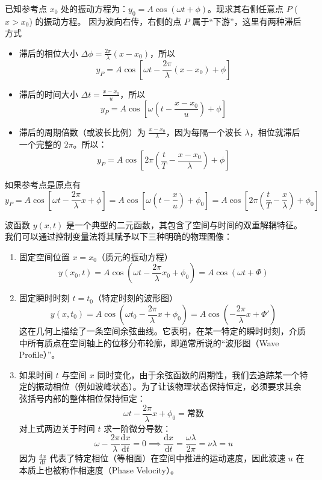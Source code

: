 \documentclass[lang=cn,11pt]{elegantbook}
\begin{document}
\begin{theorem}[平面简谐波函数推导]
已知参考点 $x_0$ 处的振动方程为：$y_0 = A \cos(\omega t + \phi)$。现求其右侧任意点 $P$ ($x > x_0$) 的振动方程。
因为波向右传，右侧的点 $P$ 属于“下游”，这里有两种滞后方式
\begin{itemize}
\item 滞后的相位大小 $\Delta \phi = \frac{2\pi}{\lambda}(x - x_0)$，所以\[y_P = A \cos \left[ \omega t - \frac{2\pi}{\lambda}(x - x_0) + \phi \right]\]
\item 滞后的时间大小 $\Delta t = \frac{x - x_0}{u}$，所以\[y_P = A \cos \left[ \omega \left( t - \frac{x - x_0}{u} \right) + \phi \right]\]
\item 滞后的周期倍数（或波长比例）为 $\frac{x - x_0}{\lambda}$，因为每隔一个波长 $\lambda$，相位就滞后一个完整的 $2\pi$。所以：$$\boxed{y_P = A \cos \left[ 2\pi \left( \frac{t}{T} - \frac{x-x_0}{\lambda} \right) + \phi \right]}$$
\end{itemize}
如果参考点是原点有$$y_P = A \cos \left[ \omega t - \frac{2\pi}{\lambda}x + \phi \right]= A \cos \left[ \omega \left( t - \frac{x}{u} \right) + \phi_0 \right]=A \cos \left[ 2\pi \left( \frac{t}{T} - \frac{x}{\lambda} \right) + \phi_0 \right]$$
\end{theorem}
波函数 $y(x,t)$ 是一个典型的二元函数，其包含了空间与时间的双重解耦特征。我们可以通过控制变量法将其赋予以下三种明确的物理图像：
\begin{enumerate}
    \item 固定空间位置 $x = x_0$（质元的振动方程）$$y(x_0, t) = A \cos \left( \omega t - \frac{2\pi}{\lambda}x_0 + \phi_0 \right) = A \cos (\omega t + \Phi)$$
    \item 固定瞬时时刻 $t = t_0$（特定时刻的波形图）$$y(x, t_0) = A \cos \left( \omega t_0 - \frac{2\pi}{\lambda}x + \phi_0 \right) = A \cos \left( -\frac{2\pi}{\lambda}x + \Phi' \right)$$这在几何上描绘了一条空间余弦曲线。它表明，在某一特定的瞬时时刻，介质中所有质点在空间轴上的位移分布轮廓，即通常所说的“波形图（Wave Profile）”。
    \item 如果时间 $t$ 与空间 $x$ 同时变化，由于余弦函数的周期性，我们去追踪某一个特定的振动相位（例如波峰状态）。为了让该物理状态保持恒定，必须要求其余弦括号内部的整体相位保持恒定：$$\omega t - \frac{2\pi}{\lambda}x + \phi_0 = \text{常数}$$对上式两边关于时间 $t$ 求一阶微分导数：$$\omega - \frac{2\pi}{\lambda} \frac{\mathrm{d}x}{\mathrm{d}t} = 0 \implies \frac{\mathrm{d}x}{\mathrm{d}t} = \frac{\omega \lambda}{2\pi} = \nu \lambda = u$$因为 $\frac{\mathrm{d}x}{\mathrm{d}t}$ 代表了特定相位（等相面）在空间中推进的运动速度，因此波速 $u$ 在本质上也被称作相速度（Phase Velocity）。
\end{enumerate}
\end{document}
